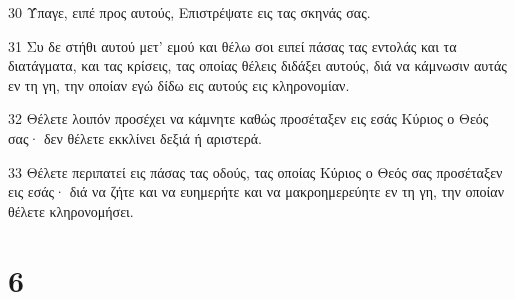 \par 30 Ύπαγε, ειπέ προς αυτούς, Επιστρέψατε εις τας σκηνάς σας.
\par 31 Συ δε στήθι αυτού μετ' εμού και θέλω σοι ειπεί πάσας τας εντολάς και τα διατάγματα, και τας κρίσεις, τας οποίας θέλεις διδάξει αυτούς, διά να κάμνωσιν αυτάς εν τη γη, την οποίαν εγώ δίδω εις αυτούς εις κληρονομίαν.
\par 32 Θέλετε λοιπόν προσέχει να κάμνητε καθώς προσέταξεν εις εσάς Κύριος ο Θεός σας· δεν θέλετε εκκλίνει δεξιά ή αριστερά.
\par 33 Θέλετε περιπατεί εις πάσας τας οδούς, τας οποίας Κύριος ο Θεός σας προσέταξεν εις εσάς· διά να ζήτε και να ευημερήτε και να μακροημερεύητε εν τη γη, την οποίαν θέλετε κληρονομήσει.

\chapter{6}

